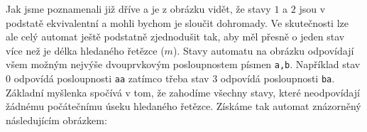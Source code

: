 \begin{center}
\end{center}

Jak jsme poznamenali již dříve a je z obrázku vidět, že stavy \(1\) a \(2\) jsou v podstatě ekvivalentní a mohli bychom je sloučit
dohromady.  Ve skutečnosti lze ale celý automat ještě podstatně zjednodušit tak, aby
měl přesně o jeden stav více než je délka hledaného řetězce (\(m\)).  Stavy automatu
na obrázku odpovídají všem možným nejvýše dvouprvkovým posloupnostem písmen 
{\tt a,b}.  Například stav \(0\) odpovídá posloupnosti {\tt aa} zatímco třeba stav \(3\)
odpovídá posloupnosti {\tt ba}. Základní myšlenka spočívá v tom, že zahodíme všechny
stavy, které neodpovídají žádnému počátečnímu úseku hledaného řetězce.
Získáme tak automat znázorněný následujícím obrázkem:

